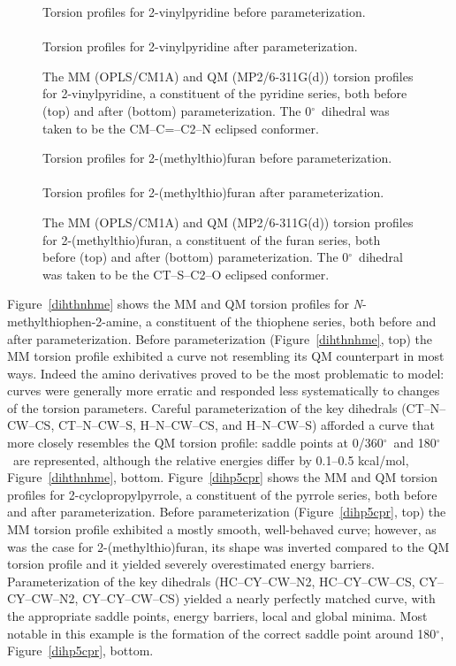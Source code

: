 \documentclass[12pt]{report}
\def\deg{$^{\circ}$}
\def\figlab{Figure}\def\figslab{\figlab s}
\newcommand*\fig[1]{\figlab~\ref{#1}}
\begin{document}
\begin{figure}[htbp]
\centering
Torsion profiles for 2-vinylpyridine before parameterization.\\
\\
Torsion profiles for 2-vinylpyridine after parameterization.\\

\caption{The MM (OPLS/CM1A) and QM (MP2/6-311G(d)) torsion profiles for 2-vinylpyridine, a constituent of the pyridine series, both before (top) and after (bottom) parameterization. The 0\deg\ dihedral was taken to be the CM--C=--C2--N eclipsed conformer.}
\label{dihp6vin}
\end{figure}

\begin{figure}[htbp]
\centering
Torsion profiles for 2-(methylthio)furan before parameterization.\\
\\
Torsion profiles for 2-(methylthio)furan after parameterization.\\

\caption{The MM (OPLS/CM1A) and QM (MP2/6-311G(d)) torsion profiles for 2-(methylthio)furan, a constituent of the furan series, both before (top) and after (bottom) parameterization. The 0\deg\ dihedral was taken to be the CT--S--C2--O eclipsed conformer.}
\label{dihfsme}
\end{figure}

\fig{dihthnhme} shows the MM and QM torsion profiles for \textit{N}-methylthiophen-2-amine, a constituent of the thiophene series, both before and after parameterization. Before parameterization (\fig{dihthnhme}, top) the MM torsion profile exhibited a curve not resembling its QM counterpart in most ways. Indeed the amino derivatives proved to be the most problematic to model: curves were generally more erratic and responded less systematically to changes of the torsion parameters. Careful parameterization of the key dihedrals (CT--N--CW--CS, CT--N--CW--S, H--N--CW--CS, and H--N--CW--S) afforded a curve that more closely resembles the QM torsion profile: saddle points at 0/360\deg\ and 180\deg\ are represented, although the relative energies differ by 0.1--0.5 kcal/mol, \fig{dihthnhme}, bottom. \fig{dihp5cpr} shows the MM and QM torsion profiles for 2-cyclopropylpyrrole, a constituent of the pyrrole series, both before and after parameterization. Before parameterization (\fig{dihp5cpr}, top) the MM torsion profile exhibited a mostly smooth, well-behaved curve; however, as was the case for 2-(methylthio)furan, its shape was inverted compared to the QM torsion profile and it yielded severely overestimated energy barriers. Parameterization of the key dihedrals (HC--CY--CW--N2, HC--CY--CW--CS, CY--CY--CW--N2, CY--CY--CW--CS) yielded a nearly perfectly matched curve, with the appropriate saddle points, energy barriers, local and global minima. Most notable in this example is the formation of the correct saddle point around 180\deg, \fig{dihp5cpr}, bottom.
\end{document}
